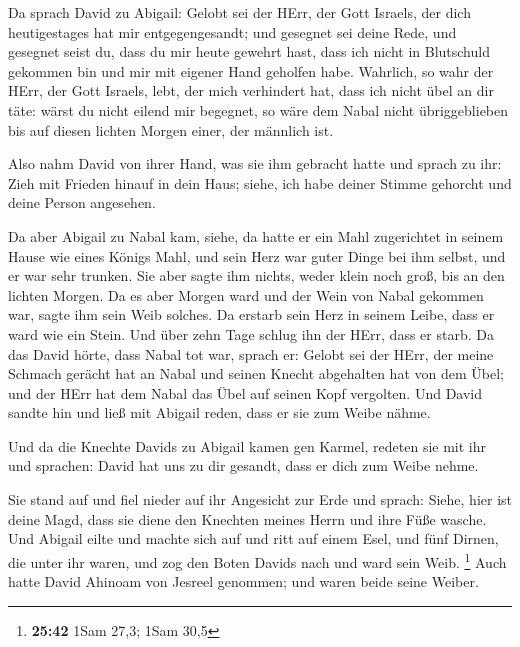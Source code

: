  Da sprach David zu Abigail: Gelobt sei der HErr, der Gott
Israels, der dich heutigestages hat mir entgegengesandt; 
und gesegnet sei deine Rede, und gesegnet seist du, dass du mir heute
gewehrt hast, dass ich nicht in Blutschuld gekommen bin und mir mit
eigener Hand geholfen habe.  Wahrlich, so wahr der HErr,
der Gott Israels, lebt, der mich verhindert hat, dass ich nicht übel an
dir täte: wärst du nicht eilend mir begegnet, so wäre dem Nabal nicht
übriggeblieben bis auf diesen lichten Morgen einer, der männlich ist.

 Also nahm David von ihrer Hand, was sie ihm gebracht hatte
und sprach zu ihr: Zieh mit Frieden hinauf in dein Haus; siehe, ich habe
deiner Stimme gehorcht und deine Person angesehen.

 Da aber Abigail zu Nabal kam, siehe, da hatte er ein Mahl
zugerichtet in seinem Hause wie eines Königs Mahl, und sein Herz war
guter Dinge bei ihm selbst, und er war sehr trunken. Sie aber sagte ihm
nichts, weder klein noch groß, bis an den lichten Morgen. 
Da es aber Morgen ward und der Wein von Nabal gekommen war, sagte ihm
sein Weib solches. Da erstarb sein Herz in seinem Leibe, dass er ward
wie ein Stein.  Und über zehn Tage schlug ihn der HErr,
dass er starb.  Da das David hörte, dass Nabal tot war,
sprach er: Gelobt sei der HErr, der meine Schmach gerächt hat an Nabal
und seinen Knecht abgehalten hat von dem Übel; und der HErr hat dem
Nabal das Übel auf seinen Kopf vergolten. Und David sandte hin und ließ
mit Abigail reden, dass er sie zum Weibe nähme.

 Und da die Knechte Davids zu Abigail kamen gen Karmel,
redeten sie mit ihr und sprachen: David hat uns zu dir gesandt, dass er
dich zum Weibe nehme.

 Sie stand auf und fiel nieder auf ihr Angesicht zur Erde
und sprach: Siehe, hier ist deine Magd, dass sie diene den Knechten
meines Herrn und ihre Füße wasche.  Und Abigail eilte und
machte sich auf und ritt auf einem Esel, und fünf Dirnen, die unter ihr
waren, und zog den Boten Davids nach und ward sein Weib. \footnote{\textbf{25:42}
  1Sam 27,3; 1Sam 30,5}  Auch hatte David Ahinoam von
Jesreel genommen; und waren beide seine Weiber.

